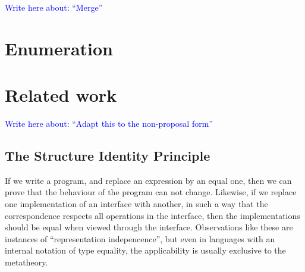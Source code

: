 \documentclass{article}
\theoremstyle{plain}%
\theoremstyle{definition}
\newcommand{\towrite}[1]{\par\textcolor{blue}{Write here about: ``#1''}\par}
\begin{document}
\towrite{Merge}




\section{Enumeration}




\begin{comment}
\section{FingerTrees}\label{sec:fingertrees}
Finger trees are often (rightfully so) referred to as ``the fastest persistent datastructure for most purposes'', but while simpler than implementations achieving the same bounds, they are still challenging to reason about; in this section, we will investigate how we can fit the description and analysis of fingertrees, or variants upon them, into the frameworks of calculating datastructures and ornamental programming.

We compare the work in calculating datastructures to solving associativity equations in groups by shifting to the Cayley representation, such as in [..]




\newpage
\section{Temporary}\label{sec:temp}
\listoftodos
%
\end{comment}



\section{Related work}\label{sec:resources}
\towrite{Adapt this to the non-proposal form}

\subsection{The Structure Identity Principle}
If we write a program, and replace an expression by an equal one, then we can prove that the behaviour of the program can not change. Likewise, if we replace one implementation of an interface with another, in such a way that the correspondence respects all operations in the interface, then the implementations should be equal when viewed through the interface. Observations like these are instances of ``representation indepencence'', but even in languages with an internal notation of type equality, the applicability is usually exclusive to the metatheory.
\end{document}
